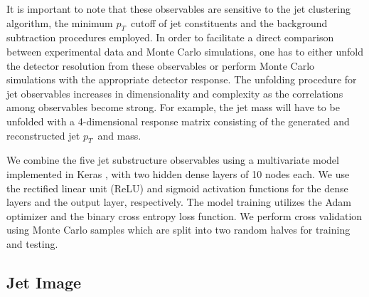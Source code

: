 \documentclass[notoc]{JHEP3}
\newcommand{\pt}{$p_{T}$}
\newcommand{\jw}{\textsc{Jewel}~}
\begin{document}
It is important to note that these observables are sensitive to the jet clustering algorithm, the minimum \pt ~cutoff of jet constituents and the background subtraction procedures employed. In order to facilitate a direct comparison between experimental data and Monte Carlo simulations, one has to either unfold the detector resolution from these observables or perform Monte Carlo simulations with the appropriate detector response. The unfolding procedure for jet observables increases in dimensionality and complexity as the correlations among observables become strong. For example, the jet mass will have to be unfolded with a 4-dimensional response matrix consisting of the generated and reconstructed jet \pt ~and mass.

We combine the five jet substructure observables using a multivariate model implemented in Keras \cite{keras}, with two hidden dense layers of 10 nodes each. We use the rectified linear unit (ReLU) \cite{nair2010rectified} and sigmoid activation functions for the dense layers and the output layer, respectively. The model training utilizes the Adam optimizer \cite{adam} and the binary cross entropy loss function. We perform cross validation using Monte Carlo samples which are split into two random halves for training and testing.


\subsection{Jet Image}
\label{sec:image}
\end{document}

